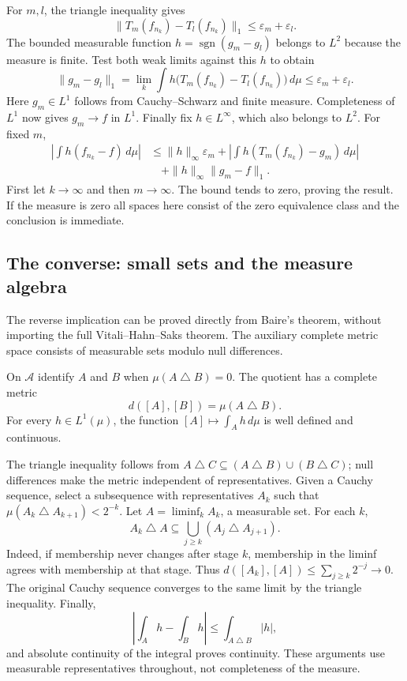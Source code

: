 For $m,l$, the triangle inequality gives
\[
\|T_m(f_{n_k})-T_l(f_{n_k})\|_1\leq\varepsilon_m+\varepsilon_l.
\]
The bounded measurable function $h=\operatorname{sgn}(g_m-g_l)$
belongs to $L^2$ because the measure is finite. Test both weak limits
against this $h$ to obtain
\[
\|g_m-g_l\|_1
=\lim_k\int h\bigl(T_m(f_{n_k})-T_l(f_{n_k})\bigr)\,d\mu
\leq\varepsilon_m+\varepsilon_l.
\]
Here $g_m\in L^1$ follows from Cauchy--Schwarz and finite measure.
Completeness of $L^1$ now gives $g_m\to f$ in $L^1$.
Finally fix $h\in L^\infty$, which also belongs to $L^2$. For fixed $m$,
\[
\begin{split}
\left|\int h(f_{n_k}-f)\,d\mu\right|
&\leq \|h\|_\infty\varepsilon_m
 +\left|\int h(T_m(f_{n_k})-g_m)\,d\mu\right|\\
&\quad+\|h\|_\infty\|g_m-f\|_1.
\end{split}
\]
First let $k\to\infty$ and then $m\to\infty$. The bound tends to zero,
proving the result. If the measure is zero all spaces here consist of
the zero equivalence class and the conclusion is immediate.
\Done

\subsection{The converse: small sets and the measure algebra}
The reverse implication can be proved directly from Baire's theorem,
without importing the full Vitali--Hahn--Saks theorem. The auxiliary
complete metric space consists of measurable sets modulo null differences.

\begin{lemma}
\label{lem:finite_measure_algebra_complete}
On $\mathcal A$ identify $A$ and $B$ when $\mu(A\mathbin\triangle B)=0$.
The quotient has a complete metric
\[
d([A],[B])=\mu(A\mathbin\triangle B).
\]
For every $h\in L^1(\mu)$, the function
$[A]\mapsto\int_Ah\,d\mu$ is well defined and continuous.
\end{lemma}
\Proof
The triangle inequality follows from
$A\mathbin\triangle C\subseteq(A\mathbin\triangle B)\cup
(B\mathbin\triangle C)$; null differences make the metric independent
of representatives. Given a Cauchy sequence, select a subsequence with
representatives $A_k$ such that
$\mu(A_k\mathbin\triangle A_{k+1})<2^{-k}$.
Let $A=\liminf_k A_k$, a measurable set. For each $k$,
\[
A_k\mathbin\triangle A
\subseteq\bigcup_{j\geq k}(A_j\mathbin\triangle A_{j+1}).
\]
Indeed, if membership never changes after stage $k$, membership in the
liminf agrees with membership at that stage. Thus
$d([A_k],[A])\leq\sum_{j\geq k}2^{-j}\to0$.
The original Cauchy sequence converges to the same limit by the triangle
inequality. Finally,
\[
\left|\int_Ah-\int_Bh\right|
\leq\int_{A\mathbin\triangle B}|h|,
\]
and absolute continuity of the integral proves continuity. These arguments
use measurable representatives throughout, not completeness of the measure.
\Done

